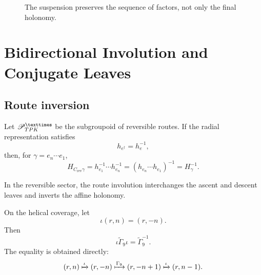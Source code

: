 \begin{figure}[htbp]
\centering
{}
\caption{The suspension preserves the sequence of factors, not only the final holonomy.}
\label{espiral:fig:skew-ledger}
\end{figure}

\chapter{Bidirectional Involution and Conjugate Leaves}

\section{Route inversion}

Let \(\mathscr P_{\TPK}^{\times}\) be the subgroupoid of reversible routes. If
the radial representation satisfies
\[
 h_{e^\dagger}=h_e^{-1},
\]
then, for \(\gamma=e_n\cdots e_1\),
\[
 H_{C_{\mathrm{rev}}\gamma}
 =h_{e_1}^{-1}\cdots h_{e_n}^{-1}
 =(h_{e_n}\cdots h_{e_1})^{-1}
 =H_\gamma^{-1}.
\]

\begin{theorem}
In the reversible sector, the route involution interchanges the ascent
and descent leaves and inverts the affine holonomy.
\end{theorem}

On the helical coverage, let
\[
 \iota(r,n)=(r,-n).
\]
Then
\begin{equation}
 \iota\widetilde\Gamma_9\iota
 =\widetilde\Gamma_9^{-1}.
 \label{espiral:eq:involucion-helice}
\end{equation}
The equality is obtained directly:
\[
 (r,n)\xmapsto{\iota}(r,-n)
 \xmapsto{\widetilde\Gamma_9}(r,-n+1)
 \xmapsto{\iota}(r,n-1).
\]

